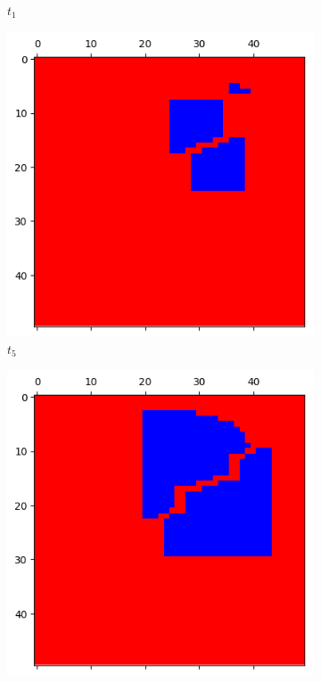 \documentclass[letterpaper]{article}
\begin{document}
\begin{figure}[H]
\begin{subfigure}{.33\textwidth}
      \caption{$t_1$}
      \label{fig:t1_50part1}
    \end{subfigure}
    \begin{subfigure}{.33\textwidth}
      \centering
      \includegraphics[width=1\linewidth]{images/assign2/visu_50-part1/t5}
      \caption{$t_5$}
      \label{fig:t5_50part1}
    \end{subfigure}
    \begin{subfigure}{.33\textwidth}
      \centering
      \includegraphics[width=1\linewidth]{images/assign2/visu_50-part1/t10}

\end{subfigure}
\end{figure}
\end{document}
